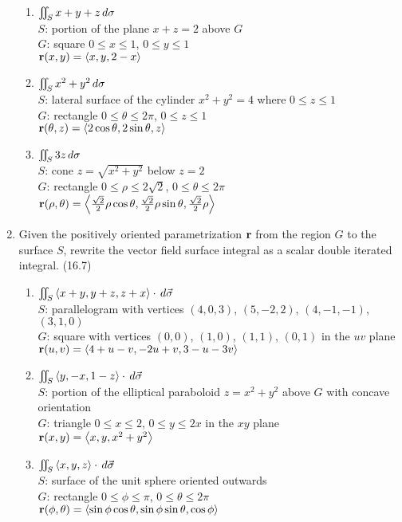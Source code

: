 \begin{enumerate}
      \begin{enumerate}
        \item 
          $\iint_S x+y+z\,d{\sigma}$\\
          $S$: portion of the plane $x+z=2$ above $G$\\
          $G$: square $0\leq x\leq 1$, $0\leq y\leq 1$\\
          $\mathbf{r}(x,y)=\left<x,y,2-x\right>$
        \item
          $\iint_S x^2+y^2\,d{\sigma}$\\
          $S$: lateral surface of the cylinder $x^2+y^2=4$ where $0\leq z\leq 1$\\
          $G$: rectangle $0\leq \theta\leq 2\pi$, $0\leq z\leq 1$\\
          $\mathbf{r}(\theta,z)=\left<2\cos\theta,2\sin\theta,z\right>$
        \item
          $\iint_S 3z\,d{\sigma}$\\
          $S$: cone $z=\sqrt{x^2+y^2}$ below $z=2$\\
          $G$: rectangle $0\leq\rho\leq 2\sqrt{2}$, $0\leq\theta\leq 2\pi$\\
          $\mathbf{r}(\rho,\theta)=\left<\frac{\sqrt{2}}{2}\rho\cos\theta,\frac{\sqrt{2}}{2}\rho\sin\theta,\frac{\sqrt{2}}{2}\rho\right>$
      \end{enumerate}

    \newpage

    \item Given the positively oriented parametrization $\mathbf{r}$ from the region $G$ to the surface $S$, rewrite the vector field surface integral as a scalar double iterated integral. (16.7)

      \begin{enumerate}
        \item
          $\iint_S \left<x+y,y+z,z+x\right>\cdot\,d{\vec\sigma}$\\%
          $S$: parallelogram with vertices $(4,0,3)$, $(5,-2,2)$, $(4,-1,-1)$, $(3,1,0)$\\
          $G$: square with vertices $(0,0)$, $(1,0)$, $(1,1)$, $(0,1)$ in the $uv$ plane\\
          $\mathbf{r}(u,v) = \left< 4+u-v, -2u+v, 3-u-3v\right>$
        \item
          $\iint_S \left<y,-x,1-z\right>\cdot\,d{\vec{\sigma}}$\\
          $S$: portion of the elliptical paraboloid $z=x^2+y^2$ above $G$ with concave orientation\\
          $G$: triangle $0\leq x\leq 2$, $0\leq y\leq 2x$ in the $xy$ plane\\
          $\mathbf{r}(x,y)=\left<x,y,x^2+y^2\right>$
        \item 
          $\iint_S \left<x,y,z\right>\cdot\,d{\vec{\sigma}}$\\
          $S$: surface of the unit sphere oriented outwards\\
          $G$: rectangle $0\leq\phi\leq\pi$, $0\leq\theta\leq2\pi$\\
          $\mathbf{r}(\phi,\theta) = \left< \sin\phi\cos\theta, \sin\phi\sin\theta, \cos\phi \right>$
      \end{enumerate}


\end{enumerate}
